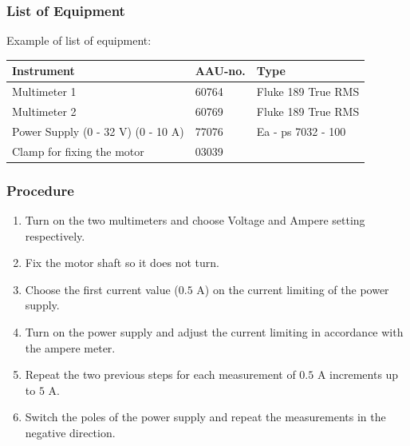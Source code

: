 \subsubsection{List of Equipment}
Example of list of equipment:
\begin{table}[H]
\begin{tabular}{|l|l|p{4cm}|}
\hline%
  \textbf{Instrument}                        &  \textbf{AAU-no.}  &  \textbf{Type}       \\
\hline%
  Multimeter 1                               &  60764             &  Fluke 189 True RMS  \\
\hline%
  Multimeter 2                   		         &  60769             &  Fluke 189 True RMS  \\
\hline%
  Power Supply \small{(0 - 32 V) (0 - 10 A)} &  77076             &  Ea - ps 7032 - 100  \\
\hline%
  Clamp for fixing the motor                 &  03039             &                      \\
\hline%
\end{tabular}
\end{table}

\subsubsection{Procedure}

\begin{enumerate}
  \item Turn on the two multimeters and choose Voltage and Ampere setting respectively.
  \item Fix the motor shaft so it does not turn.
  \item Choose the first current value ($0.5$ A) on the current limiting of the power supply.
  \item Turn on the power supply and adjust the current limiting in accordance with the ampere meter.
  \item Repeat the two previous steps for each measurement of $0.5$ A increments up to $5$ A.
  \item Switch the poles of the power supply and repeat the measurements in the negative direction.
\end{enumerate}

